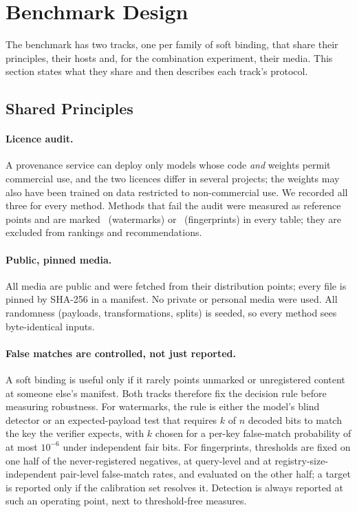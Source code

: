 \section{Benchmark Design}
\label{sec:design}
The benchmark has two tracks, one per family of soft binding, that share their principles, their hosts and, for the combination experiment, their media. This section states what they share and then describes each track's protocol.

\subsection{Shared Principles}
\label{sec:principles}
\paragraph{Licence audit.} A provenance service can deploy only models whose code \emph{and} weights permit commercial use, and the two licences differ in several projects; the weights may also have been trained on data restricted to non-commercial use. We recorded all three for every method. Methods that fail the audit were measured as reference points and are marked \dag\ (watermarks) or \ (fingerprints) in every table; they are excluded from rankings and recommendations.

\paragraph{Public, pinned media.} All media are public and were fetched from their distribution points; every file is pinned by SHA-256 in a manifest. No private or personal media were used. All randomness (payloads, transformations, splits) is seeded, so every method sees byte-identical inputs.

\paragraph{False matches are controlled, not just reported.} A soft binding is useful only if it rarely points unmarked or unregistered content at someone else's manifest. Both tracks therefore fix the decision rule before measuring robustness. For watermarks, the rule is either the model's blind detector or an expected-payload test that requires $k$ of $n$ decoded bits to match the key the verifier expects, with $k$ chosen for a per-key false-match probability of at most $10^{-6}$ under independent fair bits. For fingerprints, thresholds are fixed on one half of the never-registered negatives, at query-level and at registry-size-independent pair-level false-match rates, and evaluated on the other half; a target is reported only if the calibration set resolves it. Detection is always reported at such an operating point, next to threshold-free measures.


